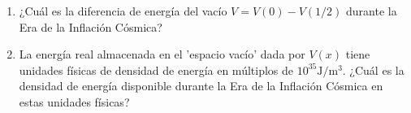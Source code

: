 \documentclass[a4paper]{article}
\newcommand{\m}{\text{m}}
\newcommand{\J}{\text{J}}
\newcounter{problema}
\begin{document}
\begin{problema}
\begin{enumerate}
	\item ¿Cuál es la diferencia de energía del vacío $V = V(0) - V(1/2)$ durante la Era de la Inflación Cósmica?

	\item La energía real almacenada en el 'espacio vacío' dada por $V(x)$ tiene unidades físicas de densidad de energía en múltiplos de $10^{35}\J/\m^3$. ¿Cuál es la densidad de energía disponible durante la Era de la Inflación Cósmica en estas unidades físicas?
\end{enumerate}

\end{problema}


\cite{algebra2}

\end{document}
